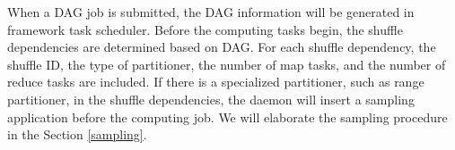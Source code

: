 {\color{blue}
When a DAG job is submitted, the DAG information will be generated in framework task scheduler. 
Before the computing tasks begin, the shuffle dependencies are determined based on DAG.
}
For each shuffle dependency, the shuffle ID, the type of partitioner, the number of map tasks, and the number of reduce tasks are included.  If there is a specialized partitioner, such as range partitioner, in the shuffle dependencies, the daemon will insert a sampling application before the {\color{blue}computing job}. We will elaborate the sampling procedure in the Section \ref{sampling}.
